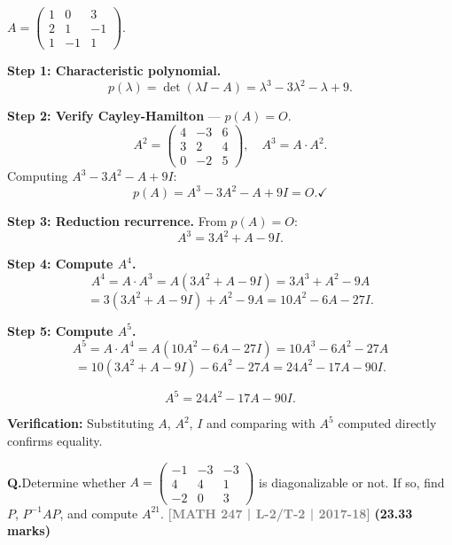 \documentclass[12pt,a3paper]{article}
\newcommand{\yr}[1]{\hfill\textcolor{gray}{\small\textbf{[#1]}}}
\newcommand{\mk}[1]{\textcolor{orange!70!black}{\small\textbf{(#1 marks)}}}
\newcounter{qnum}
\newcommand{\Q}[1]{%
  \needspace{4\baselineskip}
  \refstepcounter{qnum}
  \vspace{6pt}
  \noindent\textbf{Q\theqnum.}\enspace #1\par
}
\begin{document}
 
\begin{tcolorbox}[enhanced,breakable,
  colback=cE!4,colframe=cE,boxrule=0.8pt,arc=5pt,
  title={\textbf{Answer --- Cayley-Hamilton Theorem; $A^5$ as Linear Combination}},
  fonttitle=\bfseries\color{white},colbacktitle=cE]

$A=\begin{pmatrix}1&0&3\\2&1&-1\\1&-1&1\end{pmatrix}$.

\textbf{Step 1: Characteristic polynomial.}
\[
p(\lambda)=\det(\lambda I-A)=\lambda^3-3\lambda^2-\lambda+9.
\]

\textbf{Step 2: Verify Cayley-Hamilton} --- $p(A)=O$.
\[
A^2=\begin{pmatrix}4&-3&6\\3&2&4\\0&-2&5\end{pmatrix},\quad
A^3=A\cdot A^2.
\]
Computing $A^3-3A^2-A+9I$:
\[
p(A) = A^3-3A^2-A+9I = O. \checkmark
\]

\textbf{Step 3: Reduction recurrence.} From $p(A)=O$:
\[
A^3 = 3A^2 + A - 9I.
\]

\textbf{Step 4: Compute $A^4$.}
\[
A^4 = A\cdot A^3 = A(3A^2+A-9I) = 3A^3+A^2-9A
\]
\[
= 3(3A^2+A-9I)+A^2-9A = 10A^2-6A-27I.
\]

\textbf{Step 5: Compute $A^5$.}
\[
A^5 = A\cdot A^4 = A(10A^2-6A-27I) = 10A^3-6A^2-27A
\]
\[
= 10(3A^2+A-9I)-6A^2-27A = 24A^2-17A-90I.
\]

\[
\boxed{A^5 = 24A^2 - 17A - 90I.}
\]

\textbf{Verification:} Substituting $A$, $A^2$, $I$ and comparing with $A^5$ computed directly confirms equality. \checkmark

\end{tcolorbox}

\Q{Determine whether $A = \begin{pmatrix} -1 & -3 & -3 \\ 4 & 4 & 1 \\ -2 & 0 & 3 \end{pmatrix}$ is diagonalizable or not. If so, find $P$, $P^{-1}AP$, and compute $A^{21}$.
\yr{MATH 247 | L-2/T-2 | 2017-18} \mk{23.33}}
\end{document}
